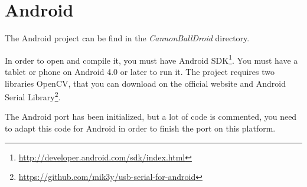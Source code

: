 \documentclass[a4paper,11pt]{report}
\begin{document}
\section{Android}

The Android project can be find in the \emph{CannonBallDroid} directory.

In order to open and compile it, you must have Android
SDK\footnote{\url{http://developer.android.com/sdk/index.html}}.
You must have a tablet or phone on Android 4.0 or later to run it.
The project requires two libraries OpenCV, that you can download on the
official website and Android Serial
Library\footnote{\url{https://github.com/mik3y/usb-serial-for-android}}.

The Android port has been initialized, but a lot of code is commented, you
need to adapt this code for Android in order to finish the port on this
platform.
\end{document}
